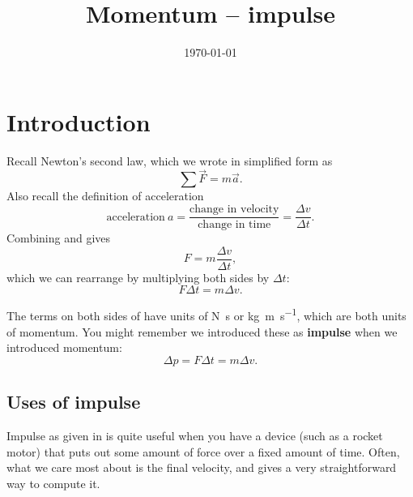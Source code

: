 \documentclass[handout]{tufte-handout}
\title{Momentum -- impulse}
\date{\today}
\author{\mobeardInstructorShort}
\begin{document}
\maketitle
{}

\section{Introduction}
Recall Newton's second law, which we wrote in simplified form as 
\begin{equation}
\sum \vec{F} = m \vec{a}.
\label{eq:secondlaw}
\end{equation}
Also recall the definition of acceleration
\begin{equation}
\text{acceleration}\ a = \dfrac{\text{change in velocity}}{\text{change in time}} = \dfrac{\Delta v}{\Delta t}.
\label{eq:acceleration}
\end{equation}
Combining  and  gives
\begin{equation}
F = m \dfrac{\Delta v}{\Delta t},
\end{equation}
which we can rearrange by multiplying both sides by $\Delta t$:
\begin{equation}
F \Delta t = m \Delta v.
\label{eq:impulse1}
\end{equation}

The terms on both sides of  have units of \si{\newton\second} or \si{\kilo\gram\meter\per\second}, which are both units of momentum. You might remember we introduced these as \textbf{impulse} when we introduced momentum:
\begin{equation}
\Delta p = F \Delta t = m \Delta v. 
\label{eq:impulse}
\end{equation}

\subsection{Uses of impulse}
Impulse as given in  is quite useful when you have a device (such as a rocket motor) that puts out some amount of force over a fixed amount of time. Often, what we care most about is the final velocity, and  gives a very straightforward way to compute it. 
\end{document}
